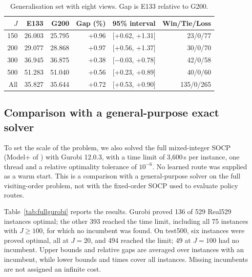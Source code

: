 \documentclass[preprint,12pt,authoryear]{elsarticle}
\begin{document}
\begin{table}[t]
\centering
\caption{Generalisation set with eight views. Gap is E133 relative to G200.}
\label{tab:gen}
\small
\begin{tabular}{rrrrrr}
\toprule
$J$ & E133 & G200 & Gap (\%) & 95\% interval & Win/Tie/Loss \\
\midrule
150 & 26.003 & 25.795 & +0.96 & [+0.62, +1.31] & 23/0/77 \\
200 & 29.077 & 28.868 & +0.97 & [+0.56, +1.37] & 30/0/70 \\
300 & 36.945 & 36.875 & +0.38 & [$-$0.03, +0.78] & 42/0/58 \\
500 & 51.283 & 51.040 & +0.56 & [+0.23, +0.89] & 40/0/60 \\
All & 35.827 & 35.644 & +0.72 & [+0.53, +0.90] & 135/0/265 \\
\bottomrule
\end{tabular}
\end{table}

\subsection{Comparison with a general-purpose exact solver}

To set the scale of the problem, we also solved the full mixed-integer SOCP (Model+ of \citet{li2025}) with Gurobi 12.0.3, with a time limit of 3,600\,s per instance, one thread and a relative optimality tolerance of $10^{-6}$. No learned route was supplied as a warm start. This is a comparison with a general-purpose solver on the full visiting-order problem, not with the fixed-order SOCP used to evaluate policy routes.

Table~\ref{tab:fullgurobi} reports the results. Gurobi proved 136 of 529 Real529 instances optimal; the other 393 reached the time limit, including all 75 instances with $J \ge 100$, for which no incumbent was found. On test500, six instances were proved optimal, all at $J = 20$, and 494 reached the limit; 49 at $J = 100$ had no incumbent. Upper bounds and relative gaps are averaged over instances with an incumbent, while lower bounds and times cover all instances. Missing incumbents are not assigned an infinite cost.
\end{document}
